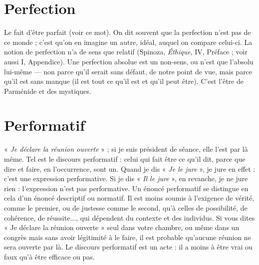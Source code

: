\section{Perfection}
Le fait d’être parfait (voir ce mot). On dit souvent que la perfection
n’est pas de ce monde ; c’est qu'on en imagine un
autre, idéal, auquel on compare celui-ci. La notion de perfection n’a de sens
que relatif (Spinoza, {\it Éthique}, IV, Préface ; voir aussi I, Appendice). Une perfection
absolue est un non-sens, ou n’est que l’absolu lui-même — non parce qu’il
serait sans défaut, de notre point de vue, mais parce qu’il est sans manque (il
est tout ce qu’il est et qu’il peut être). C’est l’être de Parménide et des mystiques.

\section{Performatif}
« {\it Je déclare la réunion ouverte} » ; si je suis président de séance,
elle l’est par là même. Tel est le discours performatif : celui
qui fait être ce qu’il dit, parce que dire et faire, en l’occurrence, sont un. Quand
je dis « {\it Je le jure} », je jure en effet : c'est une expression performative. Si je dis
« {\it Il le jure} », en revanche, je ne jure rien : l'expression n’est pas performative.
Un énoncé performatif se distingue en cela d’un énoncé descriptif ou normatif.
Il est moins soumis à l’exigence de vérité, comme le premier, ou de justesse
comme le second, qu’à celles de possibilité, de cohérence, de réussite..., qui
dépendent du contexte et des individus. Si vous dites « Je déclare la réunion
ouverte » seul dans votre chambre, ou même dans un congrès mais sans avoir
légitimité à le faire, il est probable qu'aucune réunion ne sera ouverte par là. Le
discours performatif est un acte : il a moins à être vrai ou faux qu’à être efficace
ou pas.

